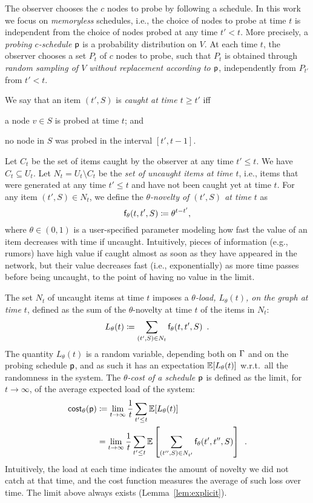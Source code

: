The observer chooses the $c$ nodes to probe by following a schedule. In this work
we focus on \emph{memoryless} schedules, i.e., the choice of nodes to probe at
time $t$ is independent from the choice of nodes probed at any time $t'<t$.
More precisely, a \emph{probing $c$-schedule} $\mathsf{p}$ is a probability
distribution on $V$. At each time $t$, the observer chooses a set $P_t$ of $c$
nodes to probe, such that $P_t$ is obtained through \emph{random sampling of $V$
without replacement according to $\mathsf{p}$}, independently from $P_{t'}$ from
$t'< t$.

We say that an item $(t',S)$ is \emph{caught at time $t\ge t'$} iff
\begin{enumerate*}
	\item a node $v\in S$ is probed at time $t$; and
	\item no node in $S$ was probed in the interval $[t',t-1]$.
\end{enumerate*}

Let $C_t$ be the set of items caught by the observer at any time $t'\le t$. We
have $C_t\subseteq U_t$. Let $N_t= U_t\setminus C_t$ be the \emph{set of
uncaught items at time $t$}, i.e., items that were generated at any time
$t'\le t$ and have not been caught yet at time $t$. For any item $(t',S)\in
N_t$, we define the \emph{$\theta$-novelty of $(t',S)$ at time $t$} as
\[
	\mathsf{f}_\theta(t,t',S)\coloneqq\theta^{t-t'},
\]
where $\theta\in(0,1)$ is a user-specified parameter modeling how fast the
value of an item decreases with time if uncaught. Intuitively, pieces of
information (e.g., rumors) have high value if caught almost as soon as they have
appeared in the network, but their value decreases fast (i.e., exponentially) as
more time passes before being uncaught, to the point of having no value in the
limit.

 The set $N_t$ of uncaught items
at time $t$ imposes a \emph{$\theta$-load, $L_\theta(t)$, on the graph at time
$t$}, defined as the sum of the $\theta$-novelty at time $t$ of the items in
$N_t$:
\[
	L_\theta(t)\coloneqq\sum_{(t',S)\in N_t} \mathsf{f}_\theta(t,t',S)\enspace.
\]
The quantity $L_\theta(t)$ is a random variable, depending both on $\Gamma$ and on
the probing schedule $\mathsf{p}$, and as such it has an expectation
$\mathbb{E}[L_\theta(t)]$ w.r.t.~all the randomness in the system. The
\emph{$\theta$-cost of a schedule $\mathsf{p}$} is defined as the limit, for
$t\rightarrow\infty$, of the average expected load of the system:
\begin{align*}
	\mathsf{cost}_\theta(\mathsf{p})&\coloneqq\lim_{t\rightarrow\infty}\frac{1}{t}\sum_{t'\le
	t}\mathbb{E}[L_\theta(t)]\\
	&=\lim_{t\rightarrow\infty}\frac{1}{t}\sum_{t'\le
	t}\mathbb{E}\left[\sum_{(t'',S)\in N_{t'}}\mathsf{f}_\theta(t',t'',S)\right]\enspace.
\end{align*}
Intuitively, the load at each time indicates the amount of novelty we did not
catch at that time, and the cost function measures the average of such loss over
time. The limit above always exists (Lemma~\ref{lem:explicit}).

